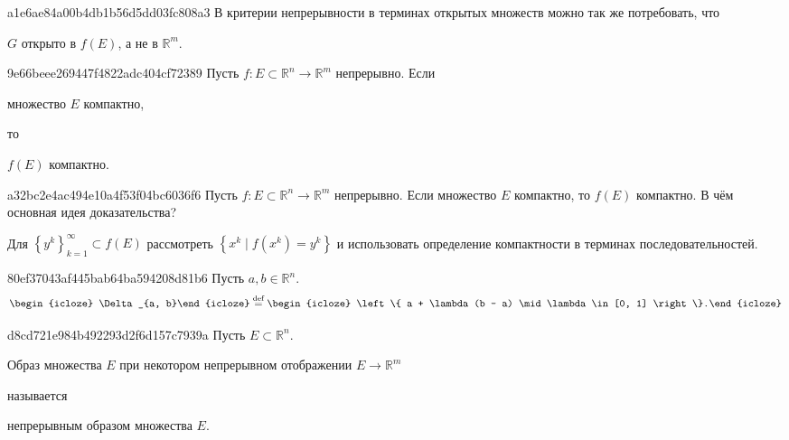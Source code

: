 \begin{note}{a1e6ae84a00b4db1b56d5dd03fc808a3}
    В критерии непрерывности в терминах открытых множеств можно так же потребовать, что \begin{icloze}{1}\({ G }\) открыто в \({ f(E) }\), а не в \({ \mathbb R^{m} }\).\end{icloze}
\end{note}

\begin{note}{9e66beee269447f4822adc404cf72389}
    Пусть \({ f : E \subset \mathbb R^{n} \to \mathbb R^{m} }\) непрерывно.
    Если \begin{icloze}{2}множество \({ E }\) компактно,\end{icloze} то \begin{icloze}{1}\({ f(E) }\) компактно.\end{icloze}
\end{note}

\begin{note}{a32bc2e4ac494e10a4f53f04bc6036f6}
    Пусть \({ f : E \subset \mathbb R^{n} \to \mathbb R^{m} }\) непрерывно.
    Если множество \({ E }\) компактно, то \({ f(E) }\) компактно.
    В чём основная идея доказательства?

    \begin{cloze}{1}
        Для \({ \left\{ y^{k} \right\}_{k = 1}^{\infty} \subset f(E) }\) рассмотреть \({ \left\{ x^{k} \mid f(x^{k}) = y^{k} \right\} }\) и использовать определение компактности в терминах последовательностей.
    \end{cloze}
\end{note}

\begin{note}{80ef37043af445bab64ba594208d81b6}
    Пусть \({ a, b \in \mathbb R^{n} }\).
    \[
        \begin{icloze}{2}\Delta_{a, b}\end{icloze} \overset{\text{def}}= \begin{icloze}{1}\left\{ a + \lambda(b - a) \mid \lambda \in [0, 1] \right\}.\end{icloze}
    \]
\end{note}

\begin{note}{d8cd721e984b492293d2f6d157c7939a}
    Пусть \({ E \subset \mathbb R^{n} }\). \begin{icloze}{1}Образ множества \({ E }\) при некотором непрерывном отображении \({ E \to \mathbb R^{m} }\)\end{icloze} называется \begin{icloze}{2}непрерывным образом множества \({ E }\).\end{icloze}
\end{note}

